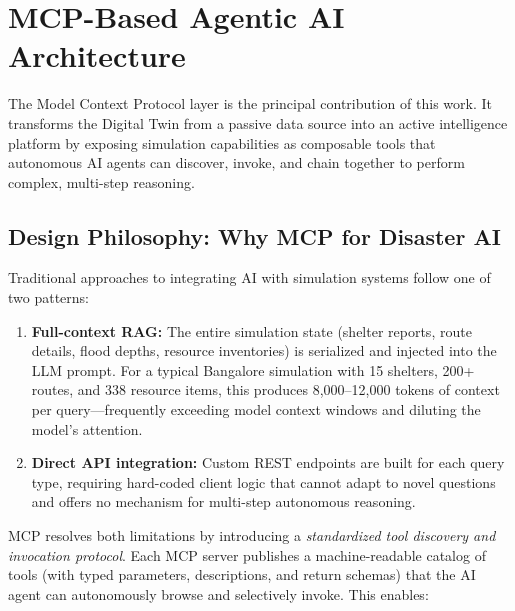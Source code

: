 \documentclass[journal]{IEEEtran}
\begin{document}
\section{MCP-Based Agentic AI Architecture}
\label{sec:mcp}

The Model Context Protocol layer is the principal contribution of this work.
It transforms the Digital Twin from a passive data source into an active
intelligence platform by exposing simulation capabilities as composable tools
that autonomous AI agents can discover, invoke, and chain together to perform
complex, multi-step reasoning.

\subsection{Design Philosophy: Why MCP for Disaster AI}

Traditional approaches to integrating AI with simulation systems follow one
of two patterns:

\begin{enumerate}[leftmargin=*]
    \item \textbf{Full-context RAG:} The entire simulation state (shelter
    reports, route details, flood depths, resource inventories) is serialized
    and injected into the LLM prompt. For a typical Bangalore simulation with
    15 shelters, 200+ routes, and 338 resource items, this produces
    8,000--12,000 tokens of context per query---frequently exceeding model
    context windows and diluting the model's attention.

    \item \textbf{Direct API integration:} Custom REST endpoints are built
    for each query type, requiring hard-coded client logic that cannot adapt
    to novel questions and offers no mechanism for multi-step autonomous
    reasoning.
\end{enumerate}

MCP resolves both limitations by introducing a \emph{standardized tool
discovery and invocation protocol}. Each MCP server publishes a machine-readable
catalog of tools (with typed parameters, descriptions, and return schemas)
that the AI agent can autonomously browse and selectively invoke. This
enables:
\end{document}

